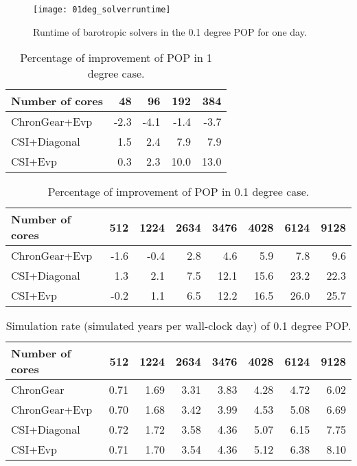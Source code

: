 \documentclass{sig-alternate}
\begin{document}
\begin {figure}
\centering
\texttt{[image: 01deg\_solverruntime]}
\caption []{Runtime of barotropic solvers in the 0.1 degree POP for one day.\label {fig:runtime01}}
\end {figure}

\begin{table*}
\centering
\caption{Percentage of improvement of POP in 1 degree case.  \label{tab:improve_1}}
\begin{tabular}{|l|r|r|r|r|}
\hline
Number of cores & 48  & 96   & 192 & 384 \\\hline
ChronGear+Evp &-2.3 &-4.1	&-1.4  & -3.7 \\\hline
CSI+Diagonal  & 1.5 & 2.4	&7.9  &7.9 \\\hline
CSI+Evp	      &0.3 & 2.3	&10.0  &13.0 \\\hline
\end{tabular}
\end{table*}


\begin{table*}
\centering
\caption {Percentage of improvement of POP in 0.1 degree case.  \label{tab:improve_01}}
\begin{tabular}{|l|r|r|r|r|r|r|r|}
\hline
Number of cores & 512  & 1224   & 2634 & 3476 & 4028 & 6124 & 9128\\
\hline
ChronGear+Evp &-1.6 &-0.4	&2.8  & 4.6 & 5.9 & 7.8 & 9.6\\\hline
CSI+Diagonal  & 1.3 & 2.1	&7.5  &12.1 &15.6 &23.2 &22.3\\\hline
CSI+Evp	      &-0.2 & 1.1	&6.5  &12.2 &16.5 &26.0 &25.7\\
\hline
\end{tabular}
\end{table*}

\begin{table*}
\centering
\caption {Simulation rate (simulated years per wall-clock day) of 0.1 degree POP.  \label{tab:improve_01}}
\begin{tabular}{|l|r|r|r|r|r|r|r|}
\hline
Number of cores & 512  & 1224   & 2634 & 3476 & 4028 & 6124 & 9128\\
\hline
ChronGear     &0.71 &1.69&3.31  &3.83 &4.28 &4.72&6.02\\\hline
ChronGear+Evp &0.70 &1.68&3.42  &3.99 &4.53 &5.08&6.69\\\hline
CSI+Diagonal  &0.72 &1.72&3.58  &4.36 &5.07 &6.15&7.75\\\hline
CSI+Evp	      &0.71 &1.70&3.54  &4.36 &5.12 &6.38&8.10\\
\hline
\end{tabular}
\end{table*}
\end{document}
